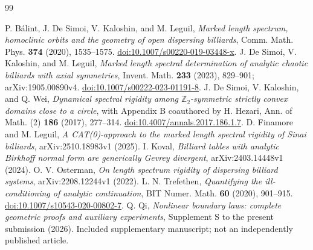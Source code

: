 \begin{thebibliography}{99}
\raggedright
{}
P. B\'alint, J. De Simoi, V. Kaloshin, and M. Leguil,
\emph{Marked length spectrum, homoclinic orbits and the geometry of open
dispersing billiards}, Comm. Math. Phys. \textbf{374} (2020), 1535--1575.
\href{https://doi.org/10.1007/s00220-019-03448-x}{doi:10.1007/s00220-019-03448-x}.
J. De Simoi, V. Kaloshin, and M. Leguil,
\emph{Marked length spectral determination of analytic chaotic billiards
with axial symmetries}, Invent. Math. \textbf{233} (2023), 829--901;
arXiv:1905.00890v4.
\href{https://doi.org/10.1007/s00222-023-01191-8}{doi:10.1007/s00222-023-01191-8}.
J. De Simoi, V. Kaloshin, and Q. Wei,
\emph{Dynamical spectral rigidity among $\mathbb Z_2$-symmetric strictly
convex domains close to a circle}, with Appendix B coauthored by H. Hezari,
Ann. of Math. (2) \textbf{186} (2017), 277--314.
\href{https://doi.org/10.4007/annals.2017.186.1.7}{doi:10.4007/annals.2017.186.1.7}.
D. Finamore and M. Leguil,
\emph{A CAT(0)-approach to the marked length spectral rigidity of Sinai
billiards}, arXiv:2510.18983v1 (2025).
I. Koval, \emph{Billiard tables with analytic Birkhoff normal form are
generically Gevrey divergent}, arXiv:2403.14448v1 (2024).
O. V. Osterman, \emph{On length spectrum rigidity of dispersing billiard
systems}, arXiv:2208.12244v1 (2022).
L. N. Trefethen, \emph{Quantifying the ill-conditioning of analytic
continuation}, BIT Numer. Math. \textbf{60} (2020), 901--915.
\href{https://doi.org/10.1007/s10543-020-00802-7}{doi:10.1007/s10543-020-00802-7}.
Q. Qi, \emph{Nonlinear boundary laws: complete geometric proofs and
auxiliary experiments}, Supplement S to the present submission (2026).
Included supplementary manuscript; not an independently published article.
\end{thebibliography}
